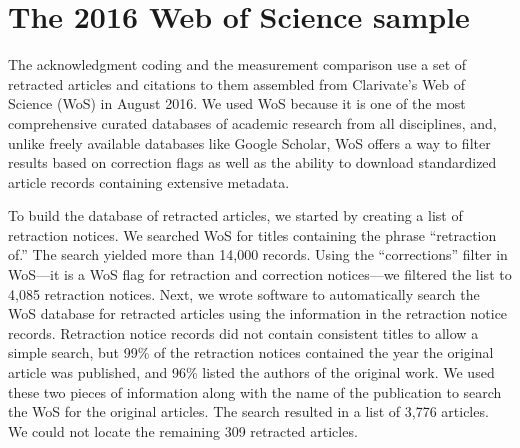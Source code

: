 \documentclass[11pt,letterpaper]{article}
\begin{document}
\section{The 2016 Web of Science sample}
\label{app:wos}
The acknowledgment coding and the measurement comparison use a set of retracted articles and citations to them assembled from Clarivate's Web of Science (WoS) in August 2016. We used WoS because it is one of the most comprehensive curated databases of academic research from all disciplines, and, unlike freely available databases like Google Scholar, WoS offers a way to filter results based on correction flags as well as the ability to download standardized article records containing extensive metadata.

To build the database of retracted articles, we started by creating a list of retraction notices. We searched WoS for titles containing the phrase ``retraction of.'' The search yielded more than 14,000 records. Using the ``corrections'' filter in WoS---it is a WoS flag for retraction and correction notices---we filtered the list to 4,085 retraction notices. Next, we wrote software to automatically search the WoS database for retracted articles using the information in the retraction notice records. Retraction notice records did not contain consistent titles to allow a simple search, but 99\% of the retraction notices contained the year the original article was published, and 96\% listed the authors of the original work. We used these two pieces of information along with the name of the publication to search the WoS for the original articles. The search resulted in a list of 3,776 articles. We could not locate the remaining 309 retracted articles.
\end{document}
